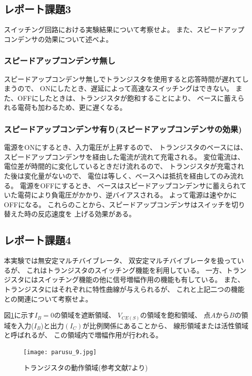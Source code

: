 \documentclass[12pt]{jarticle}
\begin{document}
\clearpage

\subsection{レポート課題3}
\begin{shadebox}
    スイッチング回路における実験結果について考察せよ。
    また、スピードアップコンデンサの効果について述べよ。
\end{shadebox}
\subsubsection*{スピードアップコンデンサ無し}
スピードアップコンデンサ無しでトランジスタを使用すると応答時間が遅れてしまうので、
ONにしたとき、遅延によって高速なスイッチングはできない。
また、OFFにしたときは、トランジスタが飽和することにより、
ベースに蓄えられる電荷も加わるため、更に遅くなる。

\subsubsection*{スピードアップコンデンサ有り(スピードアップコンデンサの効果)}
電源をONにするとき、入力電圧が上昇するので、
トランジスタのベースには、スピードアップコンデンサを経由した電流が流れて充電される。
変位電流は、電位差が時間的に変化しているときだけ流れるので、
トランジスタが充電された後は変化量がないので、
電位は等しく、ベースへは抵抗を経由してのみ流れる。
電源をOFFにするとき、
ベースはスピードアップコンデンサに蓄えられていた電荷により負電圧がかかり、逆バイアスされる。
よって電源は速やかにOFFになる。
これらのことから、スピードアップコンデンサはスイッチを切り替えた時の反応速度を
上げる効果がある。

\subsection{レポート課題4}
\begin{shadebox}
    本実験では無安定マルチバイブレータ、
    双安定マルチバイブレータを扱っているが、
    これはトランジスタのスイッチング機能を利用している。
    一方、トランジスタにはスイッチング機能の他に信号増幅作用の機能も有している。
    また、トランジスタにはそれぞれに特性曲線が与えられるが、
    これと上記二つの機能との関連について考察せよ。
\end{shadebox}
図\ref{fig9}に示す$I_B=0$の領域を遮断領域、
$V_{CE(S)}$の領域を飽和領域、
点$A$から$B$の領域を入力($I_B$)と出力$(I_C)$が比例関係にあることから、
線形領域または活性領域と呼ばれるが、
この領域内で増幅作用が行われる。
\begin{figure}[h]
    \begin{center}
        \texttt{[image: parusu\_9.jpg]}
    \end{center}
    \caption{トランジスタの動作領域(参考文献7より)}
    \label{fig9}
\end{figure}
\end{document}

